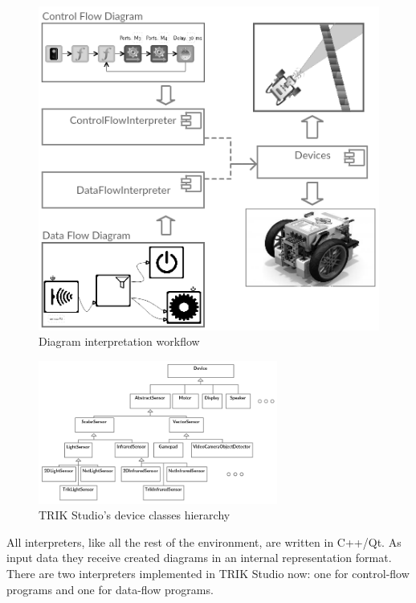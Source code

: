\documentclass[conference]{IEEEtran}
\begin{document}
\begin{figure}[ht]
    \centering
    \includegraphics[width=0.9\columnwidth]{TS_Interpreter_Architecture.png}
    \caption{Diagram interpretation workflow}
    \label{image:interpretersTSArch}
\end{figure}

\begin{figure}[ht]
    \centering
    \includegraphics[width=0.7\textwidth]{TS_Devices_Architecture.png}
    \caption{TRIK Studio's device classes hierarchy}
    \label{image:devicesTSArch}
\end{figure}

All interpreters, like all the rest of the environment, are written in C++/Qt. As input data they receive created diagrams in an internal representation format. There are two interpreters implemented in TRIK Studio now: one for control-flow programs and one for data-flow programs.
\end{document}
